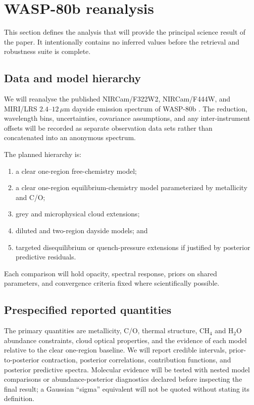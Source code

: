 \section{WASP-80b reanalysis}
\label{sec:results}

This section defines the analysis that will provide the principal science
result of the paper. It intentionally contains no inferred values before the
retrieval and robustness suite is complete.

\subsection{Data and model hierarchy}

We will reanalyse the published NIRCam/F322W2, NIRCam/F444W, and MIRI/LRS
$2.4$--$12\,\mu$m dayside emission spectrum of WASP-80b
\citep{Bell2023,WASP80Panchromatic2025}. The reduction, wavelength bins,
uncertainties, covariance assumptions, and any inter-instrument offsets will be
recorded as separate observation data sets rather than concatenated into an
anonymous spectrum. 

The planned hierarchy is:
\begin{enumerate}
 \item a clear one-region free-chemistry model;
 \item a clear one-region equilibrium-chemistry model parameterized by
 metallicity and C/O;
 \item grey and microphysical cloud extensions;
 \item diluted and two-region dayside models; and
 \item targeted disequilibrium or quench-pressure extensions if justified by
 posterior predictive residuals.
\end{enumerate}
Each comparison will hold opacity, spectral response, priors on shared
parameters, and convergence criteria fixed where scientifically possible.

\subsection{Prespecified reported quantities}

The primary quantities are metallicity, C/O, thermal structure, CH$_4$ and
H$_2$O abundance constraints, cloud optical properties, and the evidence of
each model relative to the clear one-region baseline. We will report credible
intervals, prior-to-posterior contraction, posterior correlations, contribution
functions, and posterior predictive spectra. Molecular evidence will be tested
with nested model comparisons or abundance-posterior diagnostics declared
before inspecting the final result; a Gaussian ``sigma'' equivalent will not
be quoted without stating its definition.

